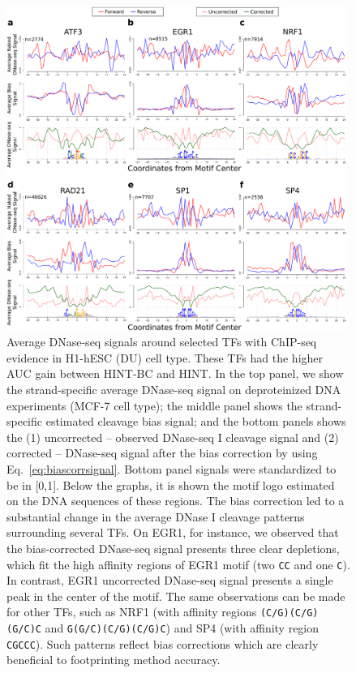 \documentclass[11pt]{article}
\begin{document}
\begin{figure}[t!]
\centering
\includegraphics[width=0.99\textwidth]{Figs/Fig5.pdf}
\caption{Average DNase-seq signals around selected TFs with ChIP-seq evidence in H1-hESC (DU) cell type. These TFs had the higher AUC gain between HINT-BC and HINT. In the top panel, we show the strand-specific average DNase-seq signal on deproteinized DNA experiments (MCF-7 cell type); the middle panel shows the strand-specific estimated cleavage bias signal; and the bottom panels shows the (1) uncorrected -- observed DNase-seq I cleavage signal and (2) corrected -- DNase-seq signal after the bias correction by using Eq.~\ref{eq:biascorrsignal}. Bottom panel signals were standardized to be in [0,1]. Below the graphs, it is shown the motif logo estimated on the DNA sequences of these regions. The bias correction led to a substantial change in the average DNase I cleavage patterns surrounding several TFs. On EGR1, for instance, we observed that the bias-corrected DNase-seq signal presents three clear depletions, which fit the high affinity regions of EGR1 motif (two {\tt CC} and one {\tt C}). In contrast, EGR1 uncorrected DNase-seq signal presents a single peak in the center of the motif. The same observations can be made for other TFs, such as NRF1 (with affinity regions {\tt (C/G)(C/G)(G/C)C} and {\tt G(G/C)(C/G)(C/G)C}) and SP4 (with affinity region {\tt CGCCC}). Such patterns reflect bias corrections which are clearly beneficial to footprinting method accuracy.}
\label{fig:lineOBCsignal}
\end{figure}
\end{document}
